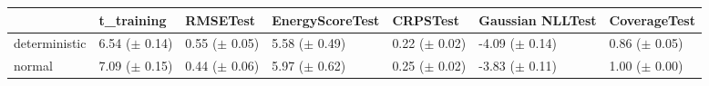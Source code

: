 \begin{tabular}{lllllll}
\toprule
 & t_training & RMSETest & EnergyScoreTest & CRPSTest & Gaussian NLLTest & CoverageTest \\
\midrule
deterministic & \makecell{6.54 \\ ($\pm$ 0.14)} & \makecell{0.55 \\ ($\pm$ 0.05)} & \makecell{5.58 \\ ($\pm$ 0.49)} & \makecell{0.22 \\ ($\pm$ 0.02)} & \makecell{-4.09 \\ ($\pm$ 0.14)} & \makecell{0.86 \\ ($\pm$ 0.05)} \\
normal & \makecell{7.09 \\ ($\pm$ 0.15)} & \makecell{0.44 \\ ($\pm$ 0.06)} & \makecell{5.97 \\ ($\pm$ 0.62)} & \makecell{0.25 \\ ($\pm$ 0.02)} & \makecell{-3.83 \\ ($\pm$ 0.11)} & \makecell{1.00 \\ ($\pm$ 0.00)} \\
\bottomrule
\end{tabular}
